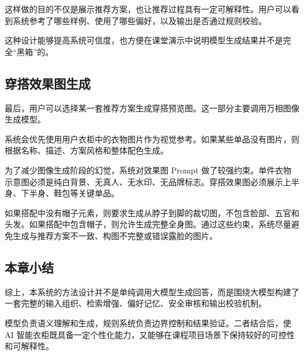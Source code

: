 \documentclass{applemlr}
\begin{document}
这样做的目的不仅是展示推荐方案，也让推荐过程具有一定可解释性。用户可以看到系统参考了哪些样例、使用了哪些偏好，以及输出是否通过规则校验。

这种设计能够提高系统可信度，也方便在课堂演示中说明模型生成结果并不是完全``黑箱''的。

\subsection{穿搭效果图生成}

最后，用户可以选择某一套推荐方案生成穿搭预览图。这一部分主要调用万相图像生成模型。

系统会优先使用用户衣柜中的衣物图片作为视觉参考。如果某些单品没有图片，则根据名称、描述、方案风格和整体配色生成。

为了减少图像生成阶段的幻觉，系统对效果图 Prompt 做了较强约束。单件衣物示意图必须是纯白背景、无真人、无水印、无品牌标志。穿搭效果图必须展示上半身、下半身、鞋包等关键单品。

如果搭配中没有帽子元素，则要求生成从脖子到脚的裁切图，不包含脸部、五官和头发。如果搭配中包含帽子，则允许生成完整全身图。通过这些约束，系统尽量避免生成与推荐方案不一致、构图不完整或错误露脸的图片。

\subsection{本章小结}

综上，本系统的方法设计并不是单纯调用大模型生成回答，而是围绕大模型构建了一套完整的输入组织、检索增强、偏好记忆、安全审核和输出校验机制。

模型负责语义理解和生成，规则系统负责边界控制和结果验证。二者结合后，使 AI 智能衣柜既具备一定个性化能力，又能够在课程项目场景下保持较好的可控性和可解释性。



\end{document}
